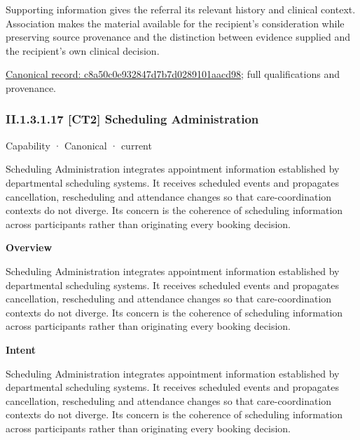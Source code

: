 Supporting information gives the referral its relevant history and clinical context. Association makes the material available for the recipient's consideration while preserving source provenance and the distinction between evidence supplied and the recipient's own clinical decision.


{\footnotesize \href{../../../../continuum/strategy/capability/feature/c8a50c0e932847d7b7d0289101aacd98.md}{Canonical record: c8a50c0e932847d7b7d0289101aacd98}; full qualifications and provenance.}\par
\subsubsection*{II.1.3.1.17 [CT2] Scheduling Administration}
\label{navigation:II.1.3.1.17}

\label{element:35fb3744c900470f9895056246a13fb1}
{\small Capability · Canonical · current}\par

Scheduling Administration integrates appointment information established by departmental scheduling systems. It receives scheduled events and propagates cancellation, rescheduling and attendance changes so that care-coordination contexts do not diverge. Its concern is the coherence of scheduling information across participants rather than originating every booking decision.



\textbf{Overview}



Scheduling Administration integrates appointment information established by departmental scheduling systems. It receives scheduled events and propagates cancellation, rescheduling and attendance changes so that care-coordination contexts do not diverge. Its concern is the coherence of scheduling information across participants rather than originating every booking decision.



\textbf{Intent}



Scheduling Administration integrates appointment information established by departmental scheduling systems. It receives scheduled events and propagates cancellation, rescheduling and attendance changes so that care-coordination contexts do not diverge. Its concern is the coherence of scheduling information across participants rather than originating every booking decision.



